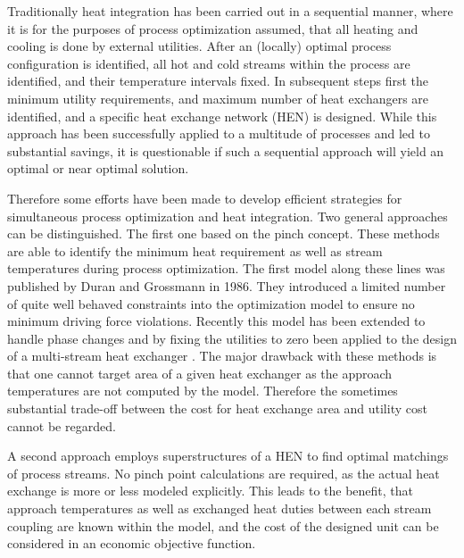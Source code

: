     Traditionally heat integration has been carried out in a sequential manner, where it is for the purposes of process
    optimization assumed, that all heating and cooling is done by external utilities. After an (locally) optimal
    process configuration is identified, all hot and cold streams within the process are identified, and their
    temperature intervals fixed. %
    In subsequent steps first the minimum utility requirements, and maximum number of heat exchangers are identified,
    and a specific heat exchange network (HEN) is designed. 
    While this approach has been successfully applied to a multitude of processes and led to substantial savings,
    it is questionable if such a sequential approach will yield an optimal or near optimal solution.

    Therefore some efforts have been made to develop efficient strategies for simultaneous process optimization
    and heat integration. Two general approaches can be distinguished. The first one based on the pinch concept.
     These methods are able to identify the minimum heat requirement
    as well as stream temperatures during process optimization. The first model along these lines was published
    by Duran and Grossmann \cite{Duran.1986} in 1986. They introduced a limited number of quite well behaved
    constraints into the optimization model to ensure no minimum driving force violations. Recently
    this model has been extended to handle phase changes and by fixing the utilities to zero been applied
    to the design of a multi-stream heat exchanger \cite{Kamath.2012}. The major drawback with these methods
    is that one cannot target area of a given heat exchanger as the approach temperatures are not computed
    by the model. Therefore the sometimes substantial trade-off between the cost for heat exchange area
    and utility cost cannot be regarded.

    A second approach employs superstructures of a HEN to find optimal matchings of process streams. No pinch
    point calculations are required, as the actual heat exchange is more or less modeled explicitly. This
    leads to the benefit, that approach temperatures as well as exchanged heat duties between each stream coupling
    are known within the model, and the cost of the designed unit can be considered in an economic objective
    function.

